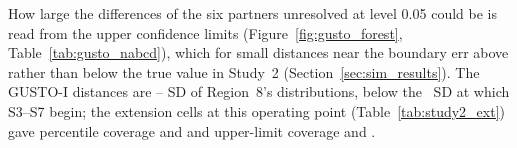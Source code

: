 \documentclass[AMA,Times1COL]{WileyNJDv5}
\begin{document}


How large the differences of the six partners unresolved at level 0.05 could be is read from the upper confidence limits (Figure~\ref{fig:gusto_forest}, Table~\ref{tab:gusto_nabcd}), which for small distances near the boundary err above rather than below the true value in Study~2 (Section~\ref{sec:sim_results}). The GUSTO-I distances are -- SD of Region~8's distributions, below the ~SD at which S3--S7 begin; the extension cells at this operating point (Table~\ref{tab:study2_ext}) gave percentile coverage  and  and upper-limit coverage  and .
\end{document}
